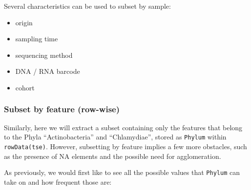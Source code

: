 \documentclass[
]{book}
\newenvironment{Shaded}{\begin{snugshade}}{\end{snugshade}}
\newcommand{\CommentTok}[1]{\textcolor[rgb]{0.56,0.35,0.01}{\textit{#1}}}
\newcommand{\FunctionTok}[1]{\textcolor[rgb]{0.00,0.00,0.00}{#1}}
\newcommand{\NormalTok}[1]{#1}
\newcommand{\SpecialCharTok}[1]{\textcolor[rgb]{0.00,0.00,0.00}{#1}}
\providecommand{\tightlist}{%
  \setlength{\itemsep}{0pt}\setlength{\parskip}{0pt}}
\begin{document}
Several characteristics can be used to subset by sample:

\begin{itemize}
\tightlist
\item
  origin
\item
  sampling time
\item
  sequencing method
\item
  DNA / RNA barcode
\item
  cohort
\end{itemize}

\hypertarget{subset-by-feature-row-wise}{%
\subsubsection{Subset by feature (row-wise)}\label{subset-by-feature-row-wise}}

Similarly, here we will extract a subset containing only the features
that belong to the Phyla ``Actinobacteria'' and ``Chlamydiae'', stored as
\texttt{Phylum} within \texttt{rowData(tse)}. However, subsetting by feature implies
a few more obstacles, such as the presence of NA elements and the
possible need for agglomeration.

As previously, we would first like to see all the possible values that
\texttt{Phylum} can take on and how frequent those are:

\begin{Shaded}
\end{Shaded}
\end{document}
